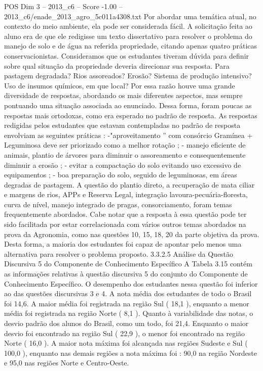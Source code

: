 \begin{textsample}{POS Dim 3 – 2013\_c6 – Score -1.00 – 2013\_c6/enade\_2013\_agro\_5c011a4308.txt}
Por abordar uma temática atual, no contexto do meio ambiente, ela pode ser considerada fácil.
A solicitação feita ao aluno era de que ele redigisse um texto dissertativo para resolver o problema do manejo de solo e de água na referida propriedade, citando apenas quatro práticas conservacionistas.
Consideramos que os estudantes tiveram dúvida para definir sobre qual situação da propriedade deveria direcionar sua resposta.
Para pastagem degradada?
Rios assoreados?
Erosão?
Sistema de produção intensivo?
Uso de insumos químicos, em que local?
Por essa razão houve uma grande diversidade de respostas, abordando os mais diferentes aspectos, mas sempre pontuando uma situação associada ao enunciado.
Dessa forma, foram poucas as respostas mais ortodoxas, como era esperado no padrão de resposta.
As respostas redigidas pelos estudantes que estavam contempladas no padrão de resposta envolviam as seguintes práticas : -"aproveitamento ” com consórcio Gramínea + Leguminosa deve ser priorizado como a melhor rotação ; - manejo eficiente de animais, plantio de árvores para diminuir o assoreamento e consequentemente diminuir a erosão ; - evitar a compactação do solo evitando uso excessivo de equipamentos ; - boa preparação do solo, seguido de leguminosas, em áreas degradas de pastagem.
A questão do plantio direto, a recuperação de mata ciliar e margens de rios, APPs e Reserva Legal, integração lavoura-pecuária-floresta, curva de nível, manejo integrado de pragas, consorciamento, foram temas frequentemente abordados.
Cabe notar que a resposta à essa questão pode ter sido facilitada por estar correlacionada com vários outros temas abordados na prova da Agronomia, como nas questões 10, 15, 18, 20 da parte objetiva da prova.
Desta forma, a maioria dos estudantes foi capaz de apontar pelo menos uma alternativa para resolver o problema proposto. 3.3.2.5 Análise da Questão Discursiva 5 do Componente de Conhecimento Específico A Tabela 3.15 contém as informações relativas à questão discursiva 5 do conjunto do Componente de Conhecimento Específico.
O desempenho dos estudantes nessa questão foi inferior ao das questões discursivas 3 e 4.
A nota média dos estudantes de todo o Brasil foi 14,6.
A maior média foi registrada na região Sul ( 18,1 ), enquanto a menor média foi registrada na região Norte ( 8,1 ).
Quanto à variabilidade das notas, o desvio padrão dos alunos do Brasil, como um todo, foi 21,4.
Enquanto o maior desvio foi encontrado na região Sul ( 22,9 ), o menor foi encontrado na região Norte ( 16,0 ).
A maior nota máxima foi alcançada nas regiões Sudeste e Sul ( 100,0 ), enquanto nas demais regiões a nota máxima foi : 90,0 na região Nordeste e 95,0 nas regiões Norte e Centro-Oeste.

\end{textsample}
